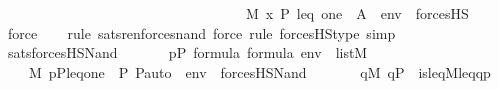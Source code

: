 \begin{isabellebody}
\ \ \ \ \ \ \ \ \ \ \ \ \ \ \ \ \ \ \ \ \ \ \ \ \ \ \ \ \ \ \ \ \ \ \ M{\isacharcomma}{\kern0pt}\ {\isacharbrackleft}{\kern0pt}x{\isacharcomma}{\kern0pt}\ P{\isacharcomma}{\kern0pt}\ leq{\isacharcomma}{\kern0pt}\ one{\isacharbrackright}{\kern0pt}\ {\isacharat}{\kern0pt}\ {\isacharparenleft}{\kern0pt}{\isacharbrackleft}{\kern0pt}A{\isacharbrackright}{\kern0pt}\ {\isacharat}{\kern0pt}\ env{\isacharparenright}{\kern0pt}\ {\isasymTurnstile}\ forcesHS{\isacharprime}{\kern0pt}{\isacharparenleft}{\kern0pt}{\isasympsi}{\isacharparenright}{\kern0pt}{\isachardoublequoteclose}{\isacharparenright}{\kern0pt}\isanewline
\ \ \ \ \isamarkupfalse%
\ force\ \isanewline
\ \ \isamarkupfalse%
{\isacharparenleft}{\kern0pt}rule\ sats{\isacharunderscore}{\kern0pt}ren{\isacharunderscore}{\kern0pt}forces{\isacharunderscore}{\kern0pt}nand{\isacharcomma}{\kern0pt}\ force{\isacharcomma}{\kern0pt}\ rule\ forcesHS{\isacharprime}{\kern0pt}{\isacharunderscore}{\kern0pt}type{\isacharcomma}{\kern0pt}\ simp{\isacharparenright}{\kern0pt}\isanewline
\ \ \isamarkupfalse%
%
\endisatagproof
{\isafoldproof}%
%
\isadelimproof
\isanewline
%
\endisadelimproof
\isanewline
{}\isamarkupfalse%
\ sats{\isacharunderscore}{\kern0pt}forcesHS{\isacharunderscore}{\kern0pt}Nand{\isacharprime}{\kern0pt}{\isacharcolon}{\kern0pt}\isanewline
\ \ \isanewline
\ \ \ \ {\isachardoublequoteopen}p{\isasymin}P{\isachardoublequoteclose}\ {\isachardoublequoteopen}{\isasymphi}{\isasymin}formula{\isachardoublequoteclose}\ {\isachardoublequoteopen}{\isasympsi}{\isasymin}formula{\isachardoublequoteclose}\ {\isachardoublequoteopen}env\ {\isasymin}\ list{\isacharparenleft}{\kern0pt}M{\isacharparenright}{\kern0pt}{\isachardoublequoteclose}\ \isanewline
\ \ \isanewline
\ \ \ \ {\isachardoublequoteopen}M{\isacharcomma}{\kern0pt}\ {\isacharbrackleft}{\kern0pt}p{\isacharcomma}{\kern0pt}P{\isacharcomma}{\kern0pt}leq{\isacharcomma}{\kern0pt}one{\isacharcomma}{\kern0pt}{\isacharless}{\kern0pt}{\isasymF}{\isacharcomma}{\kern0pt}\ {\isasymG}{\isacharcomma}{\kern0pt}\ P{\isacharcomma}{\kern0pt}\ P{\isacharunderscore}{\kern0pt}auto{\isachargreater}{\kern0pt}{\isacharbrackright}{\kern0pt}\ {\isacharat}{\kern0pt}\ env\ {\isasymTurnstile}\ forcesHS{\isacharparenleft}{\kern0pt}Nand{\isacharparenleft}{\kern0pt}{\isasymphi}{\isacharcomma}{\kern0pt}{\isasympsi}{\isacharparenright}{\kern0pt}{\isacharparenright}{\kern0pt}\ {\isasymlongleftrightarrow}\ \isanewline
\ \ \ \ \ {\isasymnot}{\isacharparenleft}{\kern0pt}{\isasymexists}q{\isasymin}M{\isachardot}{\kern0pt}\ q{\isasymin}P\ {\isasymand}\ is{\isacharunderscore}{\kern0pt}leq{\isacharparenleft}{\kern0pt}{\isacharhash}{\kern0pt}{\isacharhash}{\kern0pt}M{\isacharcomma}{\kern0pt}leq{\isacharcomma}{\kern0pt}q{\isacharcomma}{\kern0pt}p{\isacharparenright}{\kern0pt}\ {\isasymand}\ \isanewline

\end{isabellebody}
